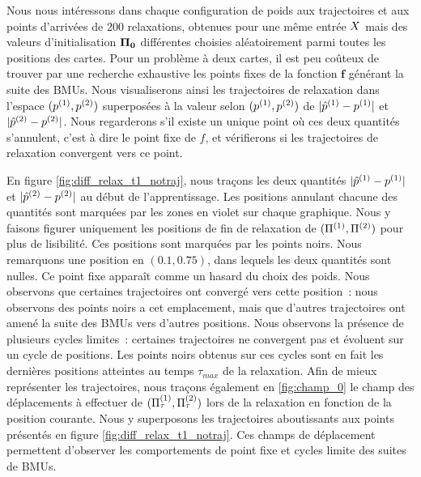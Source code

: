 \documentclass[../main]{subfiles}
\begin{document}
Nous nous intéressons dans chaque configuration de poids aux trajectoires et aux points d'arrivées de 200 relaxations, obtenues pour une même entrée $X$ mais des valeurs d'initialisation $\mathbf{\Pi_0}$ différentes choisies aléatoirement parmi toutes les positions des cartes.
Pour un problème à deux cartes, il est peu coûteux de trouver par une recherche exhaustive les points fixes de la fonction $\mathbf{f}$ générant la suite des BMUs.
Nous visualiserons ainsi les trajectoires de relaxation dans l'espace $(p^{({1})},p^{({2})})$ superposées à la valeur selon $(p^{({1})},p^{({2})})$ de $\lvert \hat{p}^{({1})} - p^{({1})} \rvert$ et $\lvert \hat{p}^{({2})} - p^{({2})}\rvert$. 
Nous regarderons s'il existe un unique point où ces deux quantités s'annulent, c'est à dire le point fixe de $f$, et vérifierons si les trajectoires de relaxation convergent vers ce point.

En figure \ref{fig:diff_relax_t1_notraj}, nous traçons les deux quantités $\lvert \hat{p}^{({1})} - p^{({1})} \rvert$ et $\lvert \hat{p}^{({2})} - p^{({2})}\rvert$ au début de l'apprentissage. Les positions annulant chacune des quantités sont marquées par les zones en violet sur chaque graphique.
Nous y faisons figurer uniquement les positions de fin de relaxation de $(\Pi^{({1})},\Pi^{({2})})$ pour plus de lisibilité. Ces positions sont marquées par les points noirs.
Nous remarquons une position en $(0.1, 0.75)$, dans lequels les deux quantités sont nulles. Ce point fixe apparaît comme un hasard du choix des poids.
Nous observons que certaines trajectoires ont convergé vers cette position~: nous observons des points noirs a cet emplacement, mais que d'autres trajectoires ont amené la suite des BMUs vers d'autres positions.
Nous observons la présence de plusieurs cycles limites~: certaines trajectoires ne convergent pas et évoluent sur un cycle de positions. Les points noirs obtenus sur ces cycles sont en fait les dernières positions atteintes au temps $\tau_{max}$ de la relaxation.
Afin de mieux représenter les trajectoires, nous traçons également en \ref{fig:champ_0} le champ des déplacements à effectuer de $(\Pi^{({1})}_\tau,\Pi^{({2})}_\tau)$ lors de la relaxation en fonction de la position courante. 
Nous y superposons les trajectoires aboutissants aux points présentés en figure \ref{fig:diff_relax_t1_notraj}.
Ces champs de déplacement permettent d'observer les comportements de point fixe et cycles limite des suites de BMUs.
\end{document}

